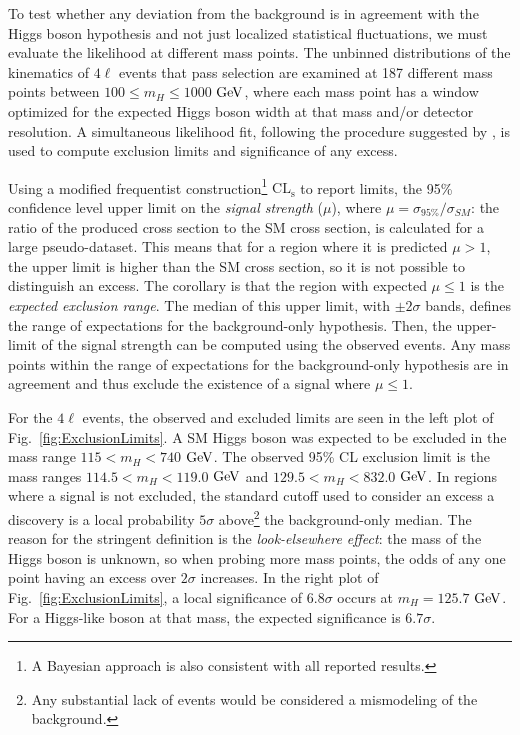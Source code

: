 To test whether any deviation from the background is in agreement with the Higgs boson hypothesis and not just localized statistical fluctuations, we must evaluate the likelihood at different mass points. The unbinned distributions of the kinematics of $4\ell$ events that pass selection are examined at 187 different mass points between $100\leq m_{H} \leq 1000$ $\rm{GeV}$, where each mass point has a window optimized for the expected Higgs boson width at that mass and/or detector resolution. A simultaneous likelihood fit, following the procedure suggested by \cite{LHC-HCG}, is used to compute exclusion limits and significance of any excess.

Using a modified frequentist construction\footnote{A Bayesian approach \cite{PDG} is also consistent with all reported results.} $\mathrm{CL_s}$ \cite{LHC-HCG,Junk,LEP_CLs} to report limits, the 95\% confidence level upper limit on the \textit{signal strength} ($\mu$), where $\mu=\sigma_{95\%}/\sigma_{SM}$: the ratio of the produced cross section to the SM cross section, is calculated for a large pseudo-dataset. This means that for a region where it is predicted $\mu>1$, the upper limit is higher than the SM cross section, so it is not possible to distinguish an excess. The corollary is that the region with expected $\mu\leq1$ is the \textit{expected exclusion range}. The median of this upper limit, with $\pm2\sigma$ bands, defines the range of expectations for the background-only hypothesis. Then, the upper-limit of the signal strength can be computed using the observed events. Any mass points within the range of expectations for the background-only hypothesis are in agreement and thus exclude the existence of a signal where $\mu\leq1$.

For the $4\ell$ events, the observed and excluded limits are seen in the left plot of Fig.~\ref{fig:ExclusionLimits}. A SM Higgs boson was expected to be excluded in the mass range $115< m_H <740$ $\rm{GeV}$. The observed 95\% CL exclusion limit is the mass ranges $114.5<m_H<119.0$ $\rm{GeV}$ and $129.5<m_H<832.0$ $\rm{GeV}$. In regions where a signal is not excluded, the standard cutoff used to consider an excess a discovery is a local probability $5\sigma$ above\footnote{Any substantial lack of events would be considered a mismodeling of the background.} the background-only median. The reason for the stringent definition is the \textit{look-elsewhere effect}: the mass of the Higgs boson is unknown, so when probing more mass points, the odds of any one point having an excess over $2\sigma$ increases. In the right plot of Fig.~\ref{fig:ExclusionLimits}, a local significance of $6.8\sigma$ occurs at $m_H=125.7$ $\rm{GeV}$. For a Higgs-like boson at that mass, the expected significance is $6.7\sigma$.

